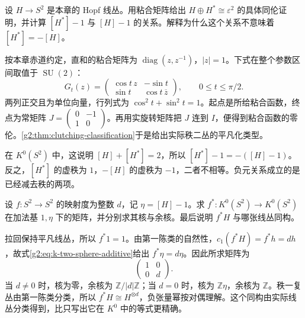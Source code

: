 \begin{exercise}\label{g2:ex:hopf-dual-sum-trivialization}
	设 \(H\to S^2\) 是本章的 Hopf 线丛。用粘合矩阵给出 \(H\oplus H^*\cong\varepsilon^2\) 的具体同伦证明，并计算 \([H^*]-1\) 与 \([H]-1\) 的关系。解释为什么这个关系不意味着 \([H^*]=-[H]\)。
\end{exercise}
\begin{solution}
	按本章赤道约定，直和的粘合矩阵为 \(\operatorname{diag}(z,z^{-1})\)，\(|z|=1\)。下式在整个参数区间取值于 \(\operatorname{SU}(2)\)：
	\[
		G_t(z)=\begin{pmatrix}\cos t\,z&-\sin t\\\sin t&\cos t\,\overline z\end{pmatrix},
		\qquad0\le t\le\pi/2.
	\]
	两列正交且为单位向量，行列式为 \(\cos^2t+\sin^2t=1\)。起点是所给粘合函数，终点为常矩阵 \(J=\left(\begin{smallmatrix}0&-1\\1&0\end{smallmatrix}\right)\)。再用实旋转矩阵把 \(J\) 连到 \(I\)，便得到粘合函数的零伦。\cref{g2:thm:clutching-classification}于是给出实际秩二丛的平凡化类型。

	在 \(K^0(S^2)\) 中，这说明 \([H]+[H^*]=2\)，所以 \([H^*]-1=-([H]-1)\)。反之，\([H^*]\) 的虚秩为 \(1\)，\(-[H]\) 的虚秩为 \(-1\)，二者不相等。负元关系成立的是已经减去秩的两项。
\end{solution}

\begin{exercise}\label{g2:ex:k-pullback-two-sphere-degree}
	设 \(f:S^2\to S^2\) 的映射度为整数 \(d\)，记 \(\eta=[H]-1\)。求 \(f^*:K^0(S^2)\to K^0(S^2)\) 在加法基 \(1,\eta\) 下的矩阵，并分别求其核与余核。最后说明 \(f^*H\) 与哪张线丛同构。
\end{exercise}
\begin{solution}
	拉回保持平凡线丛，所以 \(f^*1=1\)。由第一陈类的自然性，\(c_1(f^*H)=f^*h=dh\)，故式\eqref{g2:eq:k-two-sphere-additive}给出 \(f^*\eta=d\eta\)。因此所求矩阵为
	\[
		\begin{pmatrix}1&0\\0&d\end{pmatrix}.
	\]
	当 \(d\ne0\) 时，核为零，余核为 \(\mathbb Z/|d|\mathbb Z\)；当 \(d=0\) 时，核为 \(\mathbb Z\eta\)，余核为 \(\mathbb Z\)。秩一复丛由第一陈类分类，所以 \(f^*H\cong H^{\otimes d}\)，负张量幂按对偶理解。这个同构由实际线丛分类得到，比只写出它在 \(K^0\) 中的等式更精确。
\end{solution}

